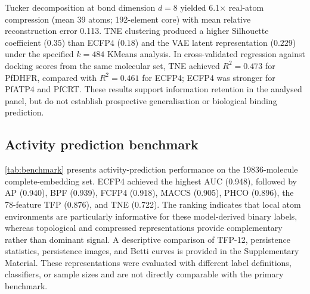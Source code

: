 \documentclass[11pt,a4paper]{article}
\begin{document}
Tucker decomposition at bond dimension $d = 8$ yielded \num{6.1}$\times$ real-atom compression (mean \num{39} atoms; \num{192}-element core) with mean relative reconstruction error \num{0.113}. TNE clustering produced a higher Silhouette coefficient ($\num{0.35}$) than ECFP4 ($\num{0.18}$) and the VAE latent representation ($\num{0.229}$) under the specified $k=484$ KMeans analysis. In cross-validated regression against docking scores from the same molecular set, TNE achieved $R^2=\num{0.473}$ for PfDHFR, compared with $R^2=\num{0.461}$ for ECFP4; ECFP4 was stronger for PfATP4 and PfCRT. These results support information retention in the analysed panel, but do not establish prospective generalisation or biological binding prediction.

\subsection{Activity prediction benchmark}

\cref{tab:benchmark} presents activity-prediction performance on the \num{19836}-molecule complete-embedding set. ECFP4 achieved the highest AUC (\num{0.948}), followed by AP (\num{0.940}), BPF (\num{0.939}), FCFP4 (\num{0.918}), MACCS (\num{0.905}), PHCO (\num{0.896}), the 78-feature TFP (\num{0.876}), and TNE (\num{0.722}). The ranking indicates that local atom environments are particularly informative for these model-derived binary labels, whereas topological and compressed representations provide complementary rather than dominant signal. A descriptive comparison of TFP-12, persistence statistics, persistence images, and Betti curves is provided in the Supplementary Material. These representations were evaluated with different label definitions, classifiers, or sample sizes and are not directly comparable with the primary benchmark.
\end{document}
